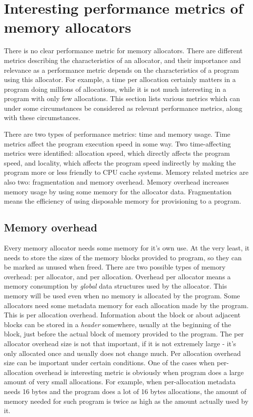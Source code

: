 \section{Interesting performance metrics of memory allocators}
\label{metrics}

There is no clear performance metric for memory allocators. There are different metrics describing the characteristics of an allocator, and their importance and relevance as a performance metric depends on the characteristics of a program using this allocator. For example, a time per allocation certainly matters in a program doing millions of allocations, while it is not much interesting in a program with only few allocations. This section lists various metrics which can under some circumstances be considered as relevant performance metrics, along with these circumstances.

There are two types of performance metrics: time and memory usage. Time metrics affect the program execution speed in some way. Two time-affecting metrics were identified: allocation speed, which directly affects the program speed, and locality, which affects the program speed indirectly by making the program more or less friendly to CPU cache systems. Memory related metrics are also two: fragmentation and memory overhead. Memory overhead increases memory usage by using some memory for the allocator data. Fragmentation means the efficiency of using disposable memory for provisioning to a program.

\subsection{Memory overhead}
\label{metrics:overhead}

Every memory allocator needs some memory for it's own use. At the very least, it needs to store the sizes of the memory blocks provided to program, so they can be marked as unused when freed. There are two possible types of memory overhead: per allocator, and per allocation. Overhead per allocator means a memory consumption by {\em global} data structures used by the allocator. This memory will be used even when no memory is allocated by the program. Some allocators need some metadata memory for each allocation made by the program. This is per allocation overhead. Information about the block or about adjacent blocks can be stored in a {\em header} somewhere, usually at the beginning of the block, just before the actual block of memory provided to the program. The per allocator overhead size is not that important, if it is not extremely large - it's only allocated once and usually does not change much. Per allocation overhead size can be important under certain conditions. One of the cases when per-allocation overhead is interesting metric is obviously when program does a large amount of very small allocations. For example, when per-allocation metadata needs 16 bytes and the program does a lot of 16 bytes allocations, the amount of memory needed for such program is twice as high as the amount actually used by it. 

